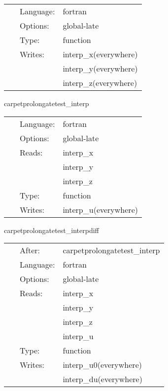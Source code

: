 \hspace{5mm}{\it set up interpolation } 


\hspace{5mm}

 \begin{tabular*}{160mm}{cll} 
~ & Language:  & fortran \\ 
~ & Options:  & global-late \\ 
~ & Type:  & function \\ 
~ & Writes:  & interp\_x(everywhere) \\ 
~& ~ &interp\_y(everywhere)\\ 
~& ~ &interp\_z(everywhere)\\ 
\end{tabular*} 


\vspace{5mm}


\hspace{5mm} carpetprolongatetest\_interp 

\hspace{5mm}{\it interpolate } 


\hspace{5mm}

 \begin{tabular*}{160mm}{cll} 
~ & Language:  & fortran \\ 
~ & Options:  & global-late \\ 
~ & Reads:  & interp\_x \\ 
~& ~ &interp\_y\\ 
~& ~ &interp\_z\\ 
~ & Type:  & function \\ 
~ & Writes:  & interp\_u(everywhere) \\ 
\end{tabular*} 


\vspace{5mm}


\hspace{5mm} carpetprolongatetest\_interpdiff 

\hspace{5mm}{\it test interpolated data } 


\hspace{5mm}

 \begin{tabular*}{160mm}{cll} 
~ & After:  & carpetprolongatetest\_interp \\ 
~ & Language:  & fortran \\ 
~ & Options:  & global-late \\ 
~ & Reads:  & interp\_x \\ 
~& ~ &interp\_y\\ 
~& ~ &interp\_z\\ 
~& ~ &interp\_u\\ 
~ & Type:  & function \\ 
~ & Writes:  & interp\_u0(everywhere) \\ 
~& ~ &interp\_du(everywhere)\\ 
\end{tabular*} 


